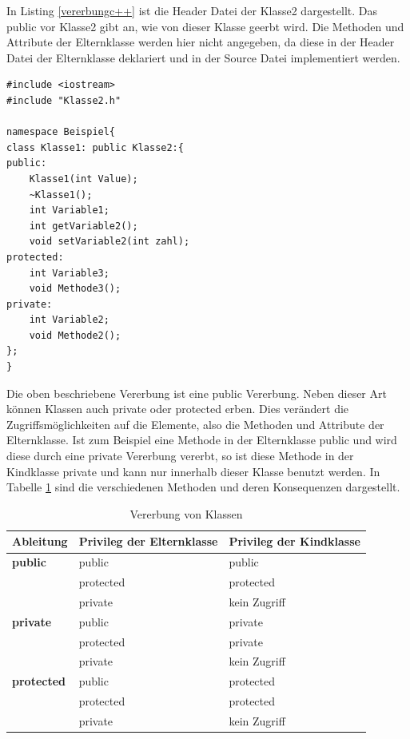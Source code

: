 \newpage
In Listing \ref{vererbungc++} ist die Header Datei der Klasse2 dargestellt. Das  \glqq public\grqq{} vor Klasse2 gibt an, wie von dieser Klasse geerbt wird. Die Methoden und Attribute der Elternklasse werden hier nicht angegeben, da diese in der Header Datei der Elternklasse deklariert und in der Source Datei implementiert werden.
\begin{lstlisting}[caption =Vererbung in C++,label=vererbungc++]
#include <iostream>
#include "Klasse2.h"

namespace Beispiel{
class Klasse1: public Klasse2:{
public:
	Klasse1(int Value);
	~Klasse1();
	int Variable1;
	int getVariable2();
	void setVariable2(int zahl);
protected:
	int Variable3;
	void Methode3();
private:
	int Variable2;
	void Methode2();
};
}
\end{lstlisting}
Die oben beschriebene Vererbung ist eine \glqq public\grqq{} Vererbung. Neben dieser Art können Klassen auch \glqq private\grqq{} oder \glqq protected\grqq{} erben. Dies verändert die Zugriffsmöglichkeiten auf die Elemente, also die Methoden und Attribute der Elternklasse.
Ist zum Beispiel eine Methode in der Elternklasse  \glqq public\grqq{} und wird diese durch eine \glqq private\grqq{} Vererbung vererbt, so ist diese Methode in der Kindklasse \glqq private\grqq{} und kann nur innerhalb dieser Klasse benutzt werden.
In Tabelle \ref{vererbungKlassen} sind die verschiedenen Methoden und deren Konsequenzen dargestellt.
\begin{table}[H]
	\centering
	\begin{tabular}{|l|l|l|}
		\hline
		\textbf{Ableitung} & \textbf{Privileg der Elternklasse} & \textbf{Privileg der Kindklasse} \\ \hline
		\textbf{public}   & public                             & public                           \\ \hline
		& protected                          & protected                        \\ \hline
		& private                            & kein Zugriff                     \\ \hline
		\textbf{private}   & public                             & private                          \\ \hline
		& protected                          & private                          \\ \hline
		& private                            & kein Zugriff                     \\ \hline
		\textbf{protected} & public                             & protected                        \\ \hline
		& protected                          & protected                        \\ \hline
		& private                            & kein Zugriff                     \\ \hline
	\end{tabular}
\caption[Vererbung von Klassen]{Vererbung von Klassen}
\label{vererbungKlassen}
\end{table}
